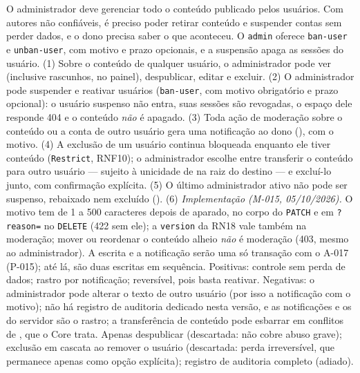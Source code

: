 {O administrador deve gerenciar todo o conteúdo publicado pelos usuários. Com autores não confiáveis, é preciso poder retirar conteúdo e suspender contas sem perder dados, e o dono precisa saber o que aconteceu. O  \texttt{admin} oferece \texttt{ban-user} e \texttt{unban-user}, com motivo e prazo opcionais, e a suspensão apaga as sessões do usuário.}
{(1) Sobre o conteúdo de qualquer usuário, o administrador pode ver (inclusive rascunhos, no painel), despublicar, editar e excluir. (2) O administrador pode suspender e reativar usuários (\texttt{ban-user}, com motivo obrigatório e prazo opcional): o usuário suspenso não entra, suas sessões são revogadas, o espaço dele responde 404 e o conteúdo \emph{não} é apagado. (3) Toda ação de moderação sobre o conteúdo ou a conta de outro usuário gera uma notificação ao dono (), com o motivo. (4) A exclusão de um usuário continua bloqueada enquanto ele tiver conteúdo (\texttt{Restrict}, RNF10); o administrador escolhe entre transferir o conteúdo para outro usuário --- sujeito à unicidade de  na raiz do destino --- e excluí-lo junto, com confirmação explícita. (5) O último administrador ativo não pode ser suspenso, rebaixado nem excluído (). (6) \emph{Implementação (M-015, 05/10/2026).} O motivo tem de 1 a 500 caracteres depois de aparado, no corpo do \texttt{PATCH} e em \texttt{?reason=} no \texttt{DELETE} (422 sem ele); a \texttt{version} da RN18 vale também na moderação; mover ou reordenar o conteúdo alheio \emph{não} é moderação (403, mesmo ao administrador). A escrita e a notificação serão uma só transação com o A-017 (P-015); até lá, são duas escritas em sequência.}
{Positivas: controle sem perda de dados; rastro por notificação; reversível, pois basta reativar. Negativas: o administrador pode alterar o texto de outro usuário (por isso a notificação com o motivo); não há registro de auditoria dedicado nesta versão, e as notificações e os  do servidor são o rastro; a transferência de conteúdo pode esbarrar em conflitos de , que o Core trata.}
{Apenas despublicar (descartada: não cobre abuso grave); exclusão em cascata ao remover o usuário (descartada: perda irreversível, que permanece apenas como opção explícita); registro de auditoria completo (adiado).}

